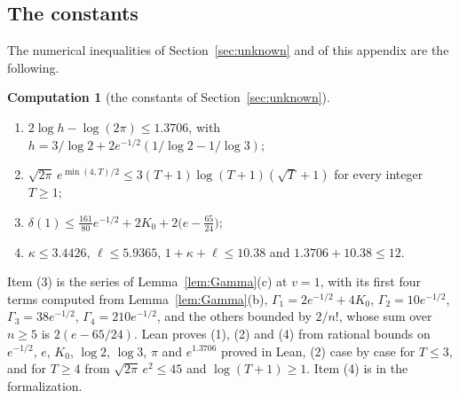 \documentclass[12pt]{amsart}
\theoremstyle{definition}
\newtheorem{computation}[theorem]{Computation}
\numberwithin{equation}{section}
\newcommand{\leanmap}[1]{\ignorespaces}
\newcommand{\mapnote}[1]{\ignorespaces}
\begin{document}
\subsection{The constants}
The numerical inequalities of Section~\ref{sec:unknown} and of this appendix are the following.

\begin{computation}[the constants of Section~\ref{sec:unknown}]\label{comp:unknown}
\leanmap{RegretKappa.UnknownBT.UB.KB_le,
  RegretKappa.UnknownBT.constK_le_num,
  RegretKappa.UnknownBT.constK_le,
  RegretKappa.UnknownBT.exp_lower,
  RegretKappa.UnknownBT.terminal_cond,
  RegretKappa.UnknownBT.UB.kappaB_le,
  RegretKappa.UnknownBT.UB.Dg_one_le,
  RegretKappa.UnknownBT.UB.lipB_le}
\mapnote{Lean proves (3) in the normalization $\Gamma/2$, with $\delta(1)/2$.}
\begin{enumerate}
\item[(1)] $2\log h-\log(2\pi)\le1.3706$, with $h=3/\log2+2e^{-1/2}(1/\log2-1/\log3)$;
\item[(2)] $\sqrt{2\pi}\,e^{\min(4,T)/2}\le3(T+1)\log(T+1)(\sqrt T+1)$ for every integer $T\ge1$;
\item[(3)] $\delta(1)\le\frac{161}{80}e^{-1/2}+2K_0+2\bigl(e-\frac{65}{24}\bigr)$;
\item[(4)] $\kappa\le3.4426$, $\ell\le5.9365$, $1+\kappa+\ell\le10.38$ and $1.3706+10.38\le12$.
\end{enumerate}
Item (3) is the series of Lemma~\ref{lem:Gamma}(c) at $v=1$, with its first four terms computed from Lemma~\ref{lem:Gamma}(b), $\Gamma_1=2e^{-1/2}+4K_0$, $\Gamma_2=10e^{-1/2}$, $\Gamma_3=38e^{-1/2}$, $\Gamma_4=210e^{-1/2}$, and the others bounded by $2/n!$, whose sum over $n\ge5$ is $2(e-65/24)$. Lean proves (1), (2) and (4) from rational bounds on $e^{-1/2}$, $e$, $K_0$, $\log2$, $\log3$, $\pi$ and $e^{1.3706}$ proved in Lean, (2) case by case for $T\le3$, and for $T\ge4$ from $\sqrt{2\pi}\,e^2\le45$ and $\log(T+1)\ge1$. Item (4) is  in the formalization.
\end{computation}



\end{document}
